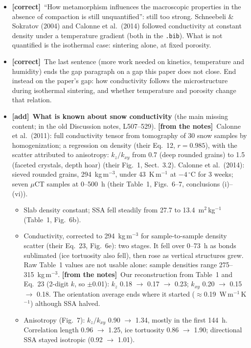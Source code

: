 \documentclass[11pt]{article}
\newcommand{\Note}{\textcolor{open}{\textbf{[from the notes]}}\ }
\newcommand{\tC}{\textcolor{miss}{\textbf{[correct]}}\ }
\newcommand{\tA}{\textcolor{have}{\textbf{[add]}}\ }
\begin{document}
\begin{enumerate}
\begin{itemize}
  \item \tC ``How metamorphism influences the macroscopic properties in the
    absence of compaction is still unquantified'': still too strong.
    Schneebeli \& Sokratov (2004) and Calonne et al.\ (2014) followed
    conductivity at constant density under a temperature gradient (both in
    the \texttt{.bib}). What is not quantified is the isothermal case:
    sintering alone, at fixed porosity.
  \item \tC The last sentence (more work needed on kinetics, temperature and
    humidity) ends the gap paragraph on a gap this paper does not close.
    End instead on the paper's gap: how conductivity follows the
    microstructure during isothermal sintering, and whether temperature and
    porosity change that relation.
  \item \tA \textbf{What is known about snow conductivity} (the main missing
    content; in the old Discussion notes, L507--529). \Note Calonne et al.\
    (2011): full conductivity tensor from tomography of 30 snow samples by
    homogenization; a regression on density (their Eq.~12, $r = 0.985$),
    with the scatter attributed to anisotropy: $k_z/k_{xy}$ from 0.7 (deep
    rounded grains) to 1.5 (faceted crystals, depth hoar) (their Fig.~1,
    Sect.~3.2). Calonne et al.\ (2014): sieved rounded grains,
    294~kg\,m$^{-3}$, under 43~K\,m$^{-1}$ at $-4\,^\circ$C for 3 weeks;
    seven $\mu$CT samples at 0--500~h (their Table~1, Figs.~6--7,
    conclusions (i)--(vi)).
    \begin{itemize}
    \item Slab density constant; SSA fell steadily from 27.7 to
      13.4~m$^2$\,kg$^{-1}$ (Table~1, Fig.~6b).
    \item Conductivity, corrected to 294~kg\,m$^{-3}$ for sample-to-sample
      density scatter (their Eq.~23, Fig.~6e): two stages. It fell over
      0--73~h as bonds sublimated (ice tortuosity also fell), then rose as
      vertical structures grew. Raw Table~1 values are not usable alone:
      sample densities range 275--315~kg\,m$^{-3}$. \Note Our
      reconstruction from Table~1 and Eq.~23 (2-digit $k$, so
      $\pm$0.01): $k_z$ 0.18 $\to$ 0.17 $\to$ 0.23; $k_{xy}$ 0.20 $\to$
      0.15 $\to$ 0.18. The orientation average ends where it started
      ($\approx$0.19~W\,m$^{-1}$\,K$^{-1}$) although SSA halved.
    \item Anisotropy (Fig.~7): $k_z/k_{xy}$ 0.90 $\to$ 1.34, mostly in the
      first 144~h. Correlation length 0.96 $\to$ 1.25, ice tortuosity 0.86
      $\to$ 1.90; directional SSA stayed isotropic (0.92 $\to$ 1.01).

\end{itemize}
\end{itemize}
\end{enumerate}
\end{document}

